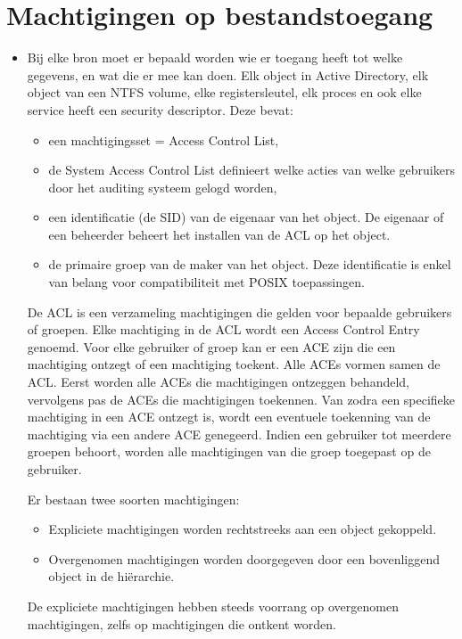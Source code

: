 \documentclass{report}
\begin{document}
	\section{Machtigingen op bestandstoegang }
	\begin{enumerate}
		 {
			\begin{itemize}
				\item Bij elke bron moet er bepaald worden wie er toegang heeft tot welke gegevens, en wat die er mee kan doen. Elk object in Active Directory, elk object van een NTFS volume, elke registersleutel, elk proces en ook elke service heeft een security descriptor. Deze bevat:
				\begin{itemize}
					\item een machtigingsset = Access Control List,
					\item de System Access Control List definieert welke acties van welke gebruikers door het auditing systeem gelogd worden,
					\item een identificatie (de SID) van de eigenaar van het object. De eigenaar of een beheerder beheert het installen van de ACL op het object.
					\item de primaire groep van de maker van het object. Deze identificatie is enkel van belang voor compatibiliteit met POSIX toepassingen.
				\end{itemize}
				De ACL is een verzameling machtigingen die gelden voor bepaalde gebruikers of groepen. Elke machtiging in de ACL wordt een Access Control Entry genoemd. Voor elke gebruiker of groep kan er een ACE zijn die een machtiging ontzegt of een machtiging toekent. Alle ACEs vormen samen de ACL. Eerst worden alle ACEs die machtigingen ontzeggen behandeld, vervolgens pas de ACEs die machtigingen toekennen. Van zodra een specifieke machtiging in een ACE ontzegt is, wordt een eventuele toekenning van de machtiging via een andere ACE genegeerd. Indien een gebruiker tot meerdere groepen behoort, worden alle machtigingen van die groep toegepast op de gebruiker. 

				Er bestaan twee soorten machtigingen:
				\begin{itemize}
					\item Expliciete machtigingen worden rechtstreeks aan een object gekoppeld.
					\item Overgenomen machtigingen worden doorgegeven door een bovenliggend object in de hiërarchie. 
				\end{itemize}
				De expliciete machtigingen hebben steeds voorrang op overgenomen machtigingen, zelfs op machtigingen die ontkent worden.
			\end{itemize}

}
\end{enumerate}
\end{document}
